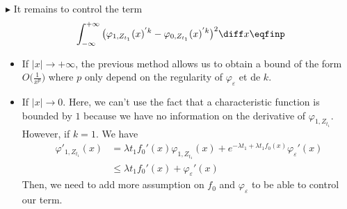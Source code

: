 $\blacktriangleright$ It remains to control the term
    \begin{align*}
     \int_{-\infty}^{+\infty} 
     \big(\varphi_{1, Z_{t_1}}(x)^{'k} - \varphi_{0, Z_{t_1}}(x)^{'k}\big)^2 \diff x 
     \eqfinp
    \end{align*}
    \begin{itemize}
        \item If $|x| \to +\infty$, the previous method allows us to obtain a bound of the form $O \big( \frac1{x^p}\big)$ where $p$ only depend on the regularity of $\varphi_\varepsilon$ et de $k$. 
        \item If $|x| \to 0$. Here, we can't use the fact that a characteristic function is bounded by $1$ because we have no information on the derivative of $\varphi_{1, Z_{t_1}}$. \\
        However, if $k = 1$. We have
            \begin{align*}
            \varphi'_{1, Z_{t_1}}(x)
            &=
            \lambda t_1 f_0'(x) \varphi_{1, Z_{t_1}}(x) + e^{-\lambda t_1 + \lambda t_1 f_0(x)} \varphi_\varepsilon'(x) \\
            &\leq 
            \lambda t_1 f_0'(x) + \varphi_\varepsilon'(x)
            \end{align*}
        Then, we need to add more assumption on $f_0$ and $\varphi_\varepsilon$ to be able to control our term. 
        \end{itemize}